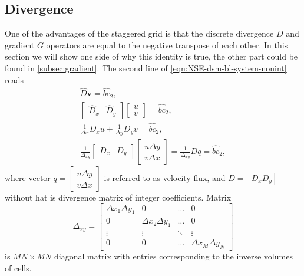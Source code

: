 \documentclass{article}
\numberwithin{equation}{section}
\begin{document}
\subsection{Divergence}\label{subsec:divergence}

One of the advantages of the staggered grid is that the discrete divergence $D$ and gradient $G$ operators are equal to the negative transpose of each other. 
In this section we will show one side of why this identity is true, the other part could be found in \cref{subsec:gradient}.
The second line of \cref{eqn:NSE-dsm-bl-system-nonint} reads
\begin{equation*}
\begin{gathered}
\hat{D}\boldsymbol{v}=\hat{bc}_2,\\
\left[ 
\begin{array}{ll}
\hat{D}_x & \hat{D}_y 	
\end{array}
\right]\left[\begin{array}{l}
u\\
v
\end{array}
\right]=\hat{bc}_2
, \\
\frac{1}{\Delta x} D_x u+\frac{1}{\Delta y} D_y v=\hat{bc}_2, \\
\frac{1}{\Delta _{xy}}\left[\begin{array}{ll}
D_x & D_y
\end{array}\right]\left[\begin{array}{l}
u \Delta y \\
v \Delta x
\end{array}\right]=\frac{1}{\Delta _{xy}} D q=\hat{bc}_2,
\end{gathered}
\end{equation*}
where vector $q=\left[\begin{array}{l}
u \Delta y \\
v \Delta x
\end{array}\right]$ is referred to as velocity flux, and $D=[D_x D_y]$ without hat is divergence matrix of integer coefficients. Matrix
\begin{equation}\label{eqn:delta-xy}
	\Delta _{xy}=
	\begin{bmatrix}{}
		{\Delta x_1\Delta y_1}		&0	&\dots	&0\\
		0		&{\Delta x_2\Delta y_1}	&\dots	&0\\
		\vdots		&\vdots	&\ddots	&\vdots\\
		0		&0	&\dots	&{\Delta x_M\Delta y_N}
	\end{bmatrix}
\end{equation}
is $MN\times MN$ diagonal matrix with entries corresponding to the inverse volumes of cells. 
\end{document}
